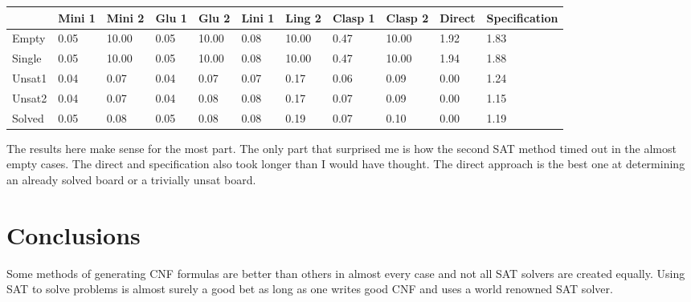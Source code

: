 \documentclass[11pt]{article} %
\begin{document}
\begin{table}[h]
    \begin{tabular}{|l|l|l|l|l|l|l|l|l|l|l|}
    \hline
    ~      & Mini 1 & Mini 2 & Glu 1 & Glu 2 & Lini 1 & Ling 2 & Clasp 1 & Clasp 2 & Direct & Specification \\ \hline
    Empty  & 0.05          & 10.00          & 0.05          & 10.00          & 0.08            & 10.00            & 0.47        & 10.00        & 1.92   & 1.83          \\ \hline
    Single & 0.05          & 10.00          & 0.05          & 10.00          & 0.08            & 10.00            & 0.47        & 10.00        & 1.94   & 1.88          \\ \hline
    Unsat1 & 0.04          & 0.07           & 0.04          & 0.07           & 0.07            & 0.17             & 0.06        & 0.09         & 0.00   & 1.24          \\ \hline
    Unsat2 & 0.04          & 0.07           & 0.04          & 0.08           & 0.08            & 0.17             & 0.07        & 0.09         & 0.00   & 1.15          \\ \hline
    Solved & 0.05          & 0.08           & 0.05          & 0.08           & 0.08            & 0.19             & 0.07        & 0.10         & 0.00   & 1.19          \\ \hline
    \end{tabular}
\end{table}

The results here make sense for the most part. The only part that surprised me is how the second SAT method timed out in the almost empty cases. The direct and specification also took longer than I would have thought. The direct approach is the best one at determining an already solved board or a trivially unsat board.

\section{Conclusions}

Some methods of generating CNF formulas are better than others in almost every case and not all SAT solvers are created equally. Using SAT to solve problems is almost surely a good bet as long as one writes good CNF and uses a world renowned SAT solver.
\end{document}
